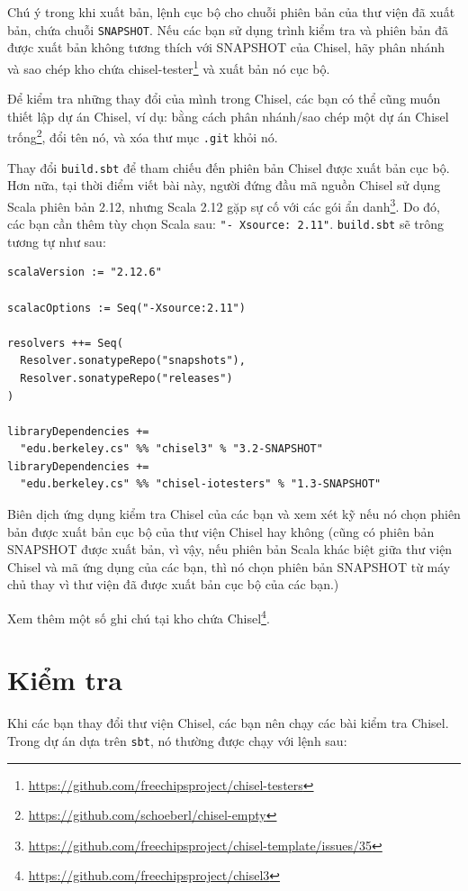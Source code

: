 \documentclass[%
    10pt,
    headinclude, footexclude,
    openright, %
    notitlepage,
    cleardoubleempty,
    headsepline,
    pointlessnumbers,
    bibtotoc, idxtotoc,
    ]{scrbook}
\newcommand{\code}[1]{{\small{\texttt{#1}}}}
\newcommand{\myref}[2]{\href{#1}{#2}}
\renewcommand{\myref}[2]{{#2}{\footnote{\url{#1}}}}
\begin{document}
Chú ý trong khi xuất bản, lệnh cục bộ cho chuỗi phiên bản của thư viện đã xuất bản, chứa chuỗi \code{SNAPSHOT}. Nếu các bạn sử dụng trình kiểm tra và phiên bản đã được xuất bản không tương thích với SNAPSHOT của Chisel, hãy phân nhánh và sao chép kho chứa \myref{https://github.com/freechipsproject/chisel-testers}{chisel-tester} và xuất bản nó cục bộ.

Để kiểm tra những thay đổi của mình trong Chisel, các bạn có thể cũng muốn thiết lập dự án Chisel,
ví dụ: bằng cách phân nhánh/sao chép một \myref{https://github.com/schoeberl/chisel-empty}{dự án Chisel trống},
đổi tên nó, và xóa thư mục \code{.git} khỏi nó.

Thay đổi \code{build.sbt} để tham chiếu đến phiên bản Chisel được xuất bản cục bộ.
Hơn nữa, tại thời điểm viết bài này, người đứng đầu mã nguồn Chisel sử dụng Scala phiên bản 2.12, nhưng Scala 2.12 gặp sự cố với \myref{https://github.com/freechipsproject/chisel-template/issues/35}{các gói ẩn danh}. Do đó, các bạn cần thêm tùy chọn Scala sau: \code{"- Xsource: 2.11"}. \code {build.sbt} sẽ trông tương tự như sau: 

\begin{verbatim}
scalaVersion := "2.12.6"

scalacOptions := Seq("-Xsource:2.11")

resolvers ++= Seq(
  Resolver.sonatypeRepo("snapshots"),
  Resolver.sonatypeRepo("releases")
)

libraryDependencies +=
  "edu.berkeley.cs" %% "chisel3" % "3.2-SNAPSHOT"
libraryDependencies +=
  "edu.berkeley.cs" %% "chisel-iotesters" % "1.3-SNAPSHOT"
\end{verbatim}

Biên dịch ứng dụng kiểm tra Chisel của các bạn và xem xét kỹ nếu nó chọn phiên bản được xuất bản cục bộ của thư viện Chisel hay không (cũng có phiên bản SNAPSHOT được xuất bản, vì vậy, nếu phiên bản Scala khác biệt giữa thư viện Chisel và mã ứng dụng của các bạn, thì nó chọn phiên bản SNAPSHOT từ máy chủ thay vì thư viện đã được xuất bản cục bộ của các bạn.)

Xem thêm \myref{https://github.com/freechipsproject/chisel3}{một số ghi chú tại kho chứa Chisel}.

\section{Kiểm tra}

Khi các bạn thay đổi thư viện Chisel, các bạn nên chạy các bài kiểm tra Chisel.
Trong dự án dựa trên \code{sbt}, nó thường được chạy với lệnh sau:
\end{document}
